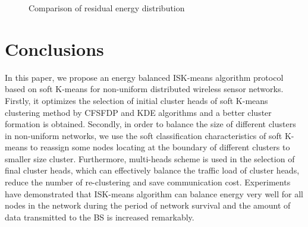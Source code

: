 \documentclass[journal,twoside,web]{ieeecolor}
\begin{document}
\begin{figure}[!t]
{\begin{minipage}[h]{0.5\linewidth}
		\end{minipage}
	}%
	\centering
	\caption{Comparison of residual energy distribution}
	\label{fig12}
\end{figure}

\section{Conclusions}
In this paper, we propose an energy balanced ISK-means algorithm protocol based on soft K-means for non-uniform distributed wireless sensor networks.  Firstly, it optimizes the selection of initial cluster heads of soft K-means clustering method by CFSFDP and KDE algorithms and a better cluster formation is obtained. Secondly, in order to balance the size of different clusters in non-uniform networks,  we use the soft classification characteristics of soft K-means to reassign some nodes locating at the boundary of different clusters to smaller size cluster.  Furthermore, multi-heads scheme is used in the selection of final cluster heads, which can effectively balance the traffic load of cluster heads, reduce the number of re-clustering and save communication cost. Experiments have demonstrated that ISK-means algorithm can balance energy very well for all nodes in the network during the period of network survival and the amount of data transmitted to the BS is increased remarkably.
\end{document}
